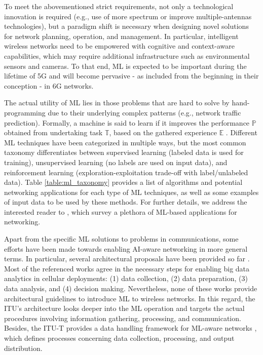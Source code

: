 \documentclass[journal]{IEEEtran}
\begin{document}
To meet the abovementioned strict requirements, not only a technological innovation is required (e.g., use of more spectrum or improve multiple-antennas technologies), but a paradigm shift is necessary when designing novel solutions for network planning, operation, and management. In particular, intelligent wireless networks need to be empowered with cognitive and context-aware capabilities, which may require additional infrastructure such as environmental sensors and cameras. To that end, ML is expected to be important during the lifetime of 5G and will become pervasive - as included from the beginning in their conception - in 6G networks. 

The actual utility of ML lies in those problems that are hard to solve by hand-programming due to their underlying complex patterns (e.g., network traffic prediction). Formally, a machine is said to learn if it improves the performance $\mathbb{P}$ obtained from undertaking task $\mathbb{T}$, based on the gathered experience $\mathbb{E}$ \cite{mitchell1997machine}. Different ML techniques have been categorized in multiple ways, but the most common taxonomy differentiates between supervised learning (labeled data is used for training), unsupervised learning (no labels are used on input data), and reinforcement learning (exploration-exploitation trade-off with label/unlabeled data). Table \ref{table:ml_taxonomy} provides a list of algorithms and potential networking applications for each type of ML techniques, as well as some examples of input data to be used by these methods. For further details, we address the interested reader to \cite{jiang2016machine, zhang2019deep, usama2019unsupervised}, which survey a plethora of ML-based applications for networking.

Apart from the specific ML solutions to problems in communications, some efforts have been made towards enabling AI-aware networking in more general terms. In particular, several architectural proposals have been provided so far \cite{bi2015wireless,chih2017big,wang2018machine}. Most of the referenced works agree in the necessary steps for enabling big data analytics in cellular deployments: (1) data collection, (2) data preparation, (3) data analysis, and (4) decision making. Nevertheless, none of these works provide architectural guidelines to introduce ML to wireless networks. In this regard, the ITU's architecture looks deeper into the ML operation and targets the actual procedures involving information gathering, processing, and communication. Besides, the ITU-T provides a data handling framework for ML-aware networks \cite{itu2019data}, which defines processes concerning data collection, processing, and output distribution. 
\end{document}
